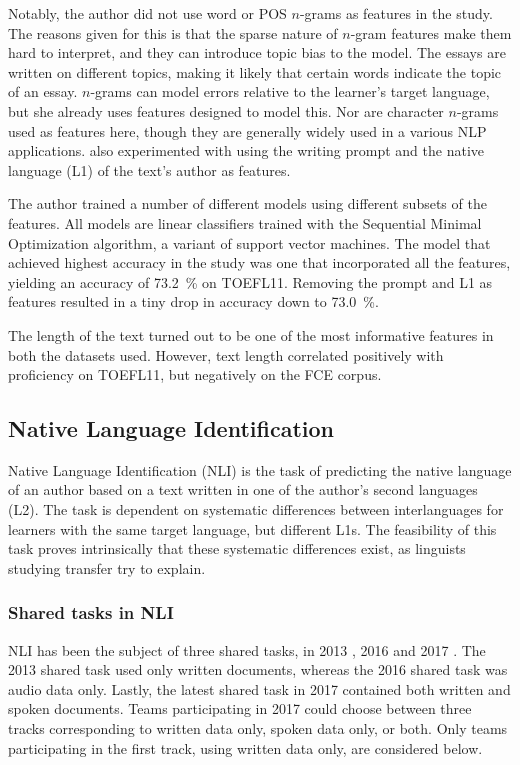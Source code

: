 Notably, the author did not use word or POS $n$-grams as features in the
study. The reasons given for this is that the sparse nature of $n$-gram
features make them hard to interpret, and they can introduce topic bias to
the model. The essays are written on different topics, making it likely that
certain words indicate the topic of an essay. $n$-grams can model errors
relative to the learner's target language, but she already uses features
designed to model this. Nor are character $n$-grams used as features here,
though they are generally widely used in a various NLP applications.
\citeauthor{vajjala17} also experimented with using the writing prompt and
the native language (L1) of the text's author as features.

The author trained a number of different models using different subsets of
the features. All models are linear classifiers trained with the Sequential
Minimal Optimization algorithm, a variant of support vector machines. The
model that achieved highest accuracy in the study was one that incorporated
all the features, yielding an accuracy of 73.2~\% on TOEFL11. Removing the
prompt and L1 as features resulted in a tiny drop in accuracy down to
73.0~\%.

The length of the text turned out to be one of the most informative features
in both the datasets used. However, text length correlated positively with
proficiency on TOEFL11, but negatively on the FCE corpus.


\subsection{Native Language Identification}

Native Language Identification (NLI) is the task of predicting the native
language of an author based on a text written in one of the author's second
languages (L2). The task is dependent on systematic differences between
interlanguages for learners with the same target language, but different L1s.
The feasibility of this task proves intrinsically that these systematic
differences exist, as linguists studying transfer try to explain.


\subsubsection{Shared tasks in NLI}

NLI has been the subject of three shared tasks, in 2013
\autocite{tetreault2013report}, 2016 \autocite{schuller2016interspeech} and
2017 \autocite{nli17}. The 2013 shared task used only written documents,
whereas the 2016 shared task was audio data only. Lastly, the latest shared
task in 2017 contained both written and spoken documents. Teams participating
in 2017 could choose between three tracks corresponding to written data only,
spoken data only, or both. Only teams participating in the first track, using
written data only, are considered below.

